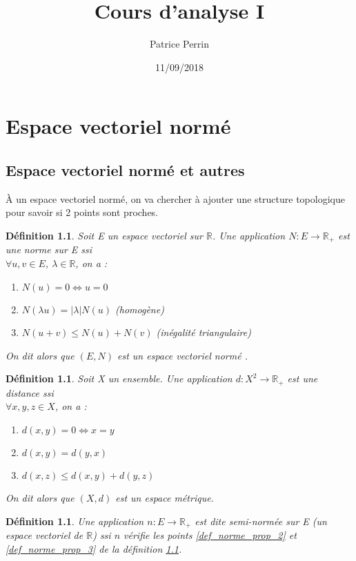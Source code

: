 \documentclass[a4paper, oneside]{report}
\theoremstyle{break}
\newtheorem{defi}[thm]{Définition}
\newcommand{\R}{\mathbb{R}}
\newcommand{\ev}{espace vectoriel }
\newcommand{\evn}{espace vectoriel normé }
\begin{document}
\title{Cours d'analyse I}
\date{11/09/2018}
\author{Patrice Perrin}
\maketitle

\tableofcontents{}
\chapter{Espace vectoriel normé}

\section{Espace vectoriel normé et autres}

À un \ev normé, on va chercher à ajouter une structure topologique pour savoir si 2 points sont proches.

\begin{defi}
Soit E un \ev sur $\R$. Une application $N:E\rightarrow \R_+$ est une norme sur E ssi\\
$\forall u, v \in E$, $\lambda \in \R$, on a :
\begin{enumerate}
\item $N(u)=0 \Leftrightarrow u=0$ \label{def_norme_prop_1}
\item $N(\lambda u)=|\lambda| N(u)$\hspace{8.5em} (homogène) \label{def_norme_prop_2}
\item $N(u+v)\leq N(u)+N(v)$ \hspace{3em} (inégalité triangulaire) \label{def_norme_prop_3}
\end{enumerate}
On dit alors que $(E, N)$ est un \evn.
\end{defi}

\begin{defi}
\label{def-evm}
Soit X un ensemble. Une application $d:X^2\rightarrow \R_+$ est une distance ssi\\
$\forall x, y, z \in X$, on a :
\begin{enumerate}
\item $d(x,y) = 0 \Leftrightarrow x=y$
\item $d(x,y)=d(y,x)$
\item $d(x,z)\leq d(x,y)+d(y,z)$
\end{enumerate}
On dit alors que $(X,d)$ est un espace métrique.
\end{defi}

\begin{defi}
Une application $n : E\rightarrow \R_+$ est dite semi-normée sur E (un \ev de $\R$) ssi $n$ vérifie les points \ref{def_norme_prop_2} et \ref{def_norme_prop_3} de la définition \ref{def-evm}.
\end{defi}
\end{document}

